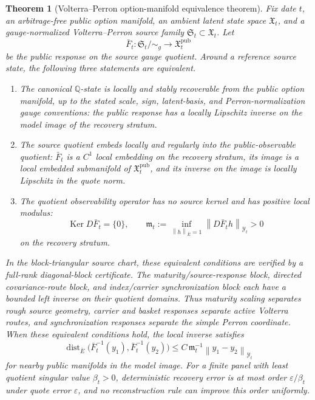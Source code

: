 \documentclass[11pt,a4paper]{amsart}
\theoremstyle{plain}
\newtheorem{theorem}{Theorem}[section]
\theoremstyle{definition}
\theoremstyle{remark}
\DeclareMathOperator{\Ker}{Ker}
\DeclareMathOperator{\dist}{dist}
\newcommand{\QQ}{\mathbb{Q}}
\newcommand{\cY}{\mathcal{Y}}
\newcommand{\norm}[1]{\left\lVert #1\right\rVert}
\begin{document}
\begin{theorem}[Volterra--Perron option-manifold equivalence theorem]\label{thm:identification-frontier}\label{thm:spine}
Fix date \(t\), an arbitrage-free public option manifold, an ambient latent state space
\(\mathfrak X_t\), and a gauge-normalized Volterra--Perron source family
\(\mathfrak S_t\subset\mathfrak X_t\).  Let
\[
        \bar F_t:\mathfrak S_t/\!\sim_g\longrightarrow \mathfrak X_t^{\mathrm{pub}}
\]
be the public response on the source gauge quotient.  Around a reference source state, the
following three statements are equivalent.
\begin{enumerate}[leftmargin=2em]
\item The canonical \(\QQ\)-state is locally and stably recoverable from the public option manifold,
up to the stated scale, sign, latent-basis, and Perron-normalization gauge conventions:
the public response has a locally Lipschitz inverse on the model image of the recovery stratum.
\item The source quotient embeds locally and regularly into the public-observable quotient:
\(\bar F_t\) is a \(C^1\) local embedding on the recovery stratum, its image is a local embedded
submanifold of \(\mathfrak X_t^{\mathrm{pub}}\), and its inverse on the image is locally
Lipschitz in the quote norm.
\item The quotient observability operator has no source kernel and has positive local modulus:
\[
        \Ker D\bar F_t=\{0\},
        \qquad
        \mathfrak m_t
        :=
        \inf_{\norm{h}_{\bar E}=1}\norm{D\bar F_t h}_{\cY_t}
        >0
\]
on the recovery stratum.
\end{enumerate}
In the block-triangular source chart, these equivalent conditions are verified by a
full-rank diagonal-block certificate.  The maturity/source-response block, directed
covariance-route block, and index/carrier synchronization block each have a bounded left inverse
on their quotient domains.  Thus maturity scaling separates rough source geometry, carrier and
basket responses separate active Volterra routes, and synchronization responses separate the
simple Perron coordinate.
When these equivalent conditions hold, the local inverse satisfies
\[
        \dist_{\bar E}\bigl(\bar F_t^{-1}(y_1),\bar F_t^{-1}(y_2)\bigr)
        \le
        C\,\mathfrak m_t^{-1}\norm{y_1-y_2}_{\cY_t}
\]
for nearby public manifolds in the model image.  For a finite panel with least quotient singular
value \(\beta_t>0\), deterministic recovery error is at most order
\(\varepsilon/\beta_t\) under quote error \(\varepsilon\), and no reconstruction rule can improve
this order uniformly.


\end{theorem}
\end{document}
